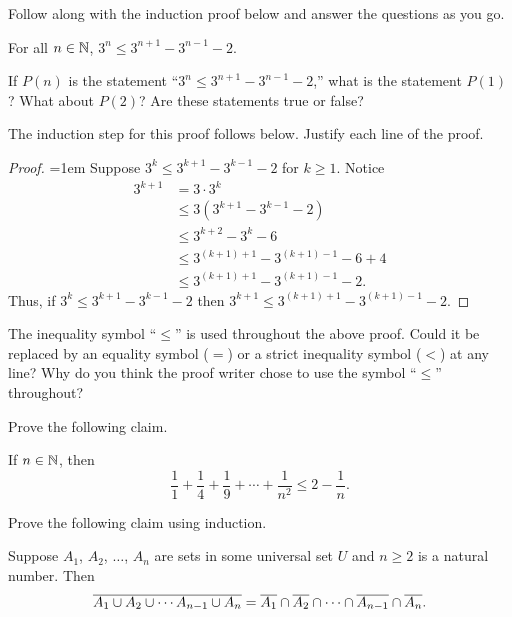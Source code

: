 \begin{question}
\item Follow along with the induction proof below and answer the questions as you go.

\begin{claim}
For all $n\in \mathbb{N}$, $3^n \leq 3^{n+1}-3^{n-1}-2$.
\end{claim}

\begin{qpart}
\item If $P(n)$ is the statement ``$3^n \leq 3^{n+1}-3^{n-1}-2$,'' what is the statement $P(1)$?  What about $P(2)$?  Are these statements true or false?

\vspace{2in}

\item The induction step for this proof follows below.  Justify each line of the proof.
\begin{proof} \openup=1em Suppose $3^k \leq 3^{k+1}-3^{k-1}-2$ for $k \geq 1$.  Notice
\begin{align*}
3^{k+1} &= 3 \cdot 3^k \\
\ &\leq 3(3^{k+1}-3^{k-1}-2)\\
\ &\leq 3^{k+2}-3^k-6 \\
\ &\leq 3^{(k+1)+1} - 3^{(k+1)-1} -6 +4 \\
\ &\leq 3^{(k+1)+1} - 3^{(k+1)-1}-2.
\end{align*}
Thus, if $3^k \leq 3^{k+1}-3^{k-1}-2$ then $3^{k+1} \leq 3^{(k+1)+1} - 3^{(k+1)-1}-2.$
\end{proof}


\item The inequality symbol ``$\leq$'' is used throughout the above proof.  Could it be replaced by an equality symbol ($=$) or a strict inequality symbol ($<$) at any line?  Why do you think the proof writer chose to use the symbol ``$\leq$'' throughout?

\vspace{2in}

\end{qpart}

\newpage

\item Prove the following claim.
\begin{claim}
If $n \in \mathbb{N}$, then \[\frac{1}{1}+\frac{1}{4}+\frac{1}{9} + \cdots + \frac{1}{n^2} \leq 2 - \frac{1}{n}.\]
\end{claim}
\newpage

\item Prove the following claim using induction.
\begin{claim}
Suppose $A_1$, $A_2$, $\ldots$, $A_n$ are sets in some universal set $U$ and $n\geq 2$ is a natural number.  Then
\[\overline{A_1 \cup A_2 \cup \cdots A_{n-1} \cup A_n}=\overline{A_1} \cap \overline{A_2} \cap \cdots \cap \overline{A_{n-1}} \cap \overline{A_n}.\]
\end{claim}
\end{question}





